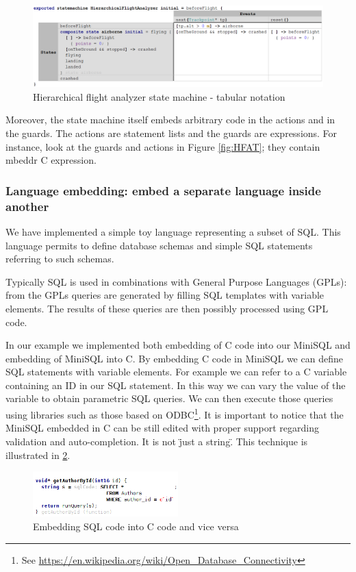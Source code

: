 \documentclass[preprint,numbers,10pt]{sigplanconf}
\begin{document}
\begin{figure}[ht!]
	\centering
	\includegraphics[scale=0.55]{screens/HierarchicalFlightAnalyzerTab}
	\caption{Hierarchical flight analyzer state machine - tabular notation}
	\label{fig:HFATab}
\end{figure}

Moreover, the state machine itself embeds arbitrary code in the actions
and in the guards. The actions are statement lists and the guards are expressions.
For instance, look at the guards and actions in Figure \ref{fig:HFAT}; they contain mbeddr C expression.

\subsubsection{Language embedding: embed a separate language inside another}
\label{evr:langembed}

We have implemented a simple toy language representing a subset of SQL. This language permits to define database schemas and simple SQL statements referring to such schemas.

Typically SQL is used in combinations with General Purpose Languages (GPLs): from the GPLs queries are generated by filling SQL templates with variable elements. The results of these queries are then possibly processed using GPL code.

In our example we implemented both embedding of C code into our MiniSQL and embedding of MiniSQL into C.
By embedding C code in MiniSQL we can define SQL statements with variable elements. For example we can refer to a C variable containing an ID in our SQL statement. In this way we can vary the value of the variable to obtain parametric SQL queries. We can then execute those queries using libraries such as those based on ODBC\footnote{See \url{https://en.wikipedia.org/wiki/Open_Database_Connectivity}}. It is important to notice that the MiniSQL embedded in C can be still edited with proper support regarding validation and auto-completion. It is not \"just a string\".
This technique is illustrated in \ref{fig:sqlembedding}.

\begin{figure}[H]
	\centering
	\includegraphics[width=0.50\textwidth]{screens/minisql_embedded.png}
	\caption{Embedding SQL code into C code and vice versa}
	\label{fig:sqlembedding}
\end{figure}
\end{document}
